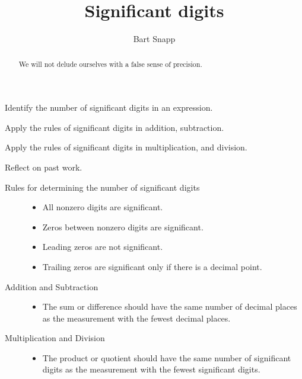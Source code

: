 \documentclass[handout,noauthor,nooutcomes,hints,12pt]{ximera}
\title{Significant digits}
\author{Bart Snapp}
\begin{document}
\begin{abstract}
We will not delude ourselves with a false sense of precision. 
\end{abstract}
\maketitle


\begin{listOutcomes}
  \item Identify the number of significant digits in an expression.
  \item Apply the rules of significant digits in addition, subtraction.
  \item Apply the rules of significant digits in multiplication, and division.
  \item{Reflect on past work.}
\end{listOutcomes}

\begin{description}
  \item[Rules for determining the number of significant digits]\hfil
\begin{itemize}
    \item All nonzero digits are significant.
    \item Zeros between nonzero digits are significant.
    \item Leading zeros are not significant.
    \item Trailing zeros are significant only if there is a decimal point.
\end{itemize}
    \item[Addition and Subtraction]\hfil
    \begin{itemize}
      \item The sum or difference should have the same number of decimal places as the measurement with the fewest decimal places.
    \end{itemize}
    \item[Multiplication and Division]\hfil
    \begin{itemize}
      \item The product or quotient should have the same number of significant digits as the measurement with the fewest significant digits.
    \end{itemize}
\end{description}
\mynewpage
\end{document}
